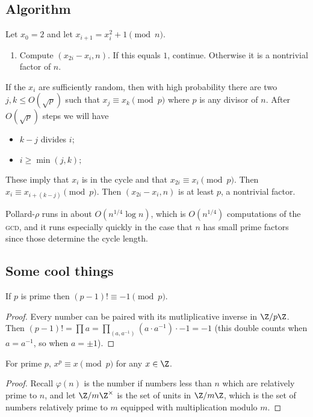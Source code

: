 \subsection{Algorithm}

Let $x_0 = 2$ and let $x_{i+1} = x_i^2 + 1 \pmod{n}$.
\begin{enumerate}[label = {Step~\arabic*.}]
\item Compute $(x_{2i} - x_i,n)$. If this equals $1$, continue. Otherwise it is a nontrivial factor of $n$.
\end{enumerate}

If the $x_i$ are sufficiently random, then with high probability there are two $j,k \leq O(\sqrt{p})$ such that $x_j \equiv x_k \pmod{p}$ where $p$ is any divisor of $n$. After $O(\sqrt{p})$ steps we will have
\begin{itemize}
\item $k-j$ divides $i$;
\item $i \geq \min(j,k);$
\end{itemize}
These imply that $x_i$ is in the cycle and that $x_{2i} \equiv x_i \pmod{p}$. Then $x_i \equiv x_{i + (k-j)} \pmod{p}$. Then $(x_{2i}-x_i,n)$ is at least $p$, a nontrivial factor.

Pollard-$\rho$ runs in about $O(n^{1/4}\log n)$, which is $O(n^{1/4})$ computations of the \textsc{gcd}, and it runs especially quickly in the case that $n$ has small prime factors since those determine the cycle length.

\subsection{Some cool things}

\begin{theorem}
If $p$ is prime then $(p-1)! \equiv -1 \pmod{p}$.
\end{theorem}

\begin{proof}
Every number can be paired with its mutliplicative inverse in $\Z/p\Z$. Then $(p-1)! = \prod a = \prod_{(a,a^{-1})}(a \cdot a^{-1}) \cdot -1 = -1$ (this double counts when $a = a^{-1}$, so when $a=\pm 1$).
\end{proof}

\begin{theorem}
For prime $p$, $x^p \equiv x \pmod{p}$ for any $x \in \Z$.
\end{theorem}

\begin{proof}
Recall $\varphi(n)$ is the number if numbers less than $n$ which are relatively prime to $n$, and let $\Z/m\Z^\times$ is the set of units in $\Z/m\Z$, which is the set of numbers relatively prime to $m$ equipped with multiplication modulo $m$.
\end{proof}